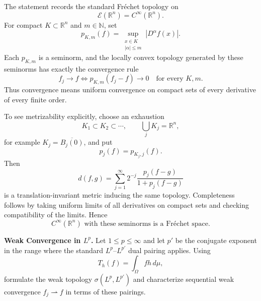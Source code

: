 \begin{solution}
The statement records the standard Fréchet topology on
\[
\mathcal E(\mathbb R^n)=C^\infty(\mathbb R^n).
\]
For compact \(K\subset\mathbb R^n\) and \(m\in\mathbb N\), set
\[
p_{K,m}(f)
=
\sup_{\substack{x\in K\\|\alpha|\le m}}
|D^\alpha f(x)|.
\]
Each \(p_{K,m}\) is a seminorm, and the locally convex topology generated by these seminorms
has exactly the convergence rule
\[
f_j\to f
\iff
p_{K,m}(f_j-f)\to0
\quad
\text{for every }K,m.
\]
Thus convergence means uniform convergence on compact sets of every derivative of every
finite order.

To see metrizability explicitly, choose an exhaustion
\[
K_1\subset K_2\subset\cdots,
\qquad
\bigcup_jK_j=\mathbb R^n,
\]
for example \(K_j=\overline{B_j(0)}\), and put
\[
p_j(f)=p_{K_j,j}(f).
\]
Then
\[
d(f,g)
=
\sum_{j=1}^{\infty}
2^{-j}
\frac{p_j(f-g)}{1+p_j(f-g)}
\]
is a translation-invariant metric inducing the same topology. Completeness follows by taking
uniform limits of all derivatives on compact sets and checking compatibility of the limits.
Hence
\[
\boxed{C^\infty(\mathbb R^n)\text{ with these seminorms is a Fréchet space}.}
\]
\end{solution}


\begin{problem}[CP-II-0424]
\label{prob:cp-ii-0424}
\textbf{Weak Convergence in \(L^p\).}
Let \(1\le p\le\infty\) and let \(p'\) be the conjugate exponent in the range
where the standard \(L^p\)--\(L^{p'}\) dual pairing applies. Using
\[
T_h(f)=\int_\Omega f h\,d\mu,
\]
formulate the weak topology \(\sigma(L^p,L^{p'})\) and characterize sequential
weak convergence \(f_j\rightharpoonup f\) in terms of these pairings.
\end{problem}

